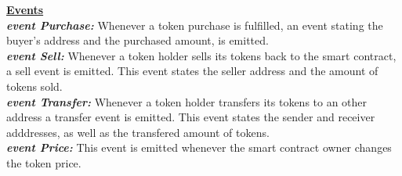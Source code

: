 \documentclass[12pt,a4paper]{article}
\begin{document}
\textbf{\underline{Events}} \\
\textbf{\emph{event Purchase:}} Whenever a token purchase is fulfilled, an event stating
the buyer's address and the purchased amount, is emitted.\\
\textbf{\emph{event Sell:}} Whenever a token holder sells its tokens back to the smart
contract, a sell event is emitted. This event states the seller address and the
amount of tokens sold.\\
\textbf{\emph{event Transfer:}} Whenever a token holder transfers its tokens to an other
address a transfer event is emitted. This event states the sender and receiver
adddresses, as well as the transfered amount of tokens.\\
\textbf{\emph{event Price:}} This event is emitted whenever the smart contract owner
changes the token price.\\
\end{document}

